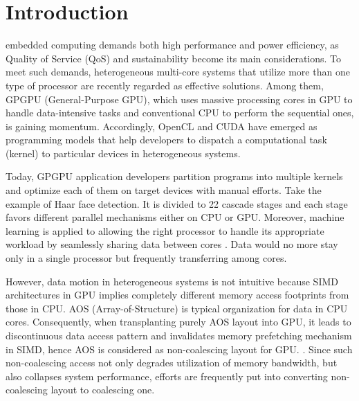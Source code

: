 \documentclass[10pt,journal,compsoc]{IEEEtran}
\begin{document}
%
\IEEEpeerreviewmaketitle


\section{Introduction}\label{sec:introduction}

 embedded computing demands both high performance and power efficiency,
as Quality of Service (QoS) and sustainability become its main considerations.
To meet such demands, heterogeneous multi-core systems that utilize more than one
type of processor are recently regarded as effective solutions.
Among them, GPGPU (General-Purpose GPU), which uses massive processing cores in GPU
to handle data-intensive tasks and conventional CPU to perform the sequential ones, is gaining momentum.
Accordingly, OpenCL and CUDA have emerged as programming models that help developers to
dispatch a computational task (kernel) to particular devices in heterogeneous systems.

Today, GPGPU application developers partition programs into multiple
kernels and optimize each of them on target devices with manual efforts.
Take the example of Haar face detection\cite{HAAR}.
It is divided to 22 cascade stages and each stage favors different parallel mechanisms either on CPU or GPU.
Moreover, machine learning is applied to allowing the right processor to handle its appropriate workload by
seamlessly sharing data between cores \cite{partition}. Data would no more stay only in a single processor
but frequently transferring among cores.


However, data motion in heterogeneous systems is not intuitive because
SIMD architectures in GPU implies completely different memory access footprints from those in CPU.
AOS (Array-of-Structure) is typical organization for data
in CPU cores. Consequently, when transplanting purely AOS layout into GPU,
it leads to discontinuous data access pattern and invalidates memory prefetching mechanism in SIMD, hence AOS is considered as non-coalescing layout for GPU.
\cite{CuMAPz}\cite{MemoryThreadLevelParallelism}.
Since such non-coalescing access not only degrades utilization of memory bandwidth, but also collapses system performance, efforts are frequently put into converting non-coalescing layout to coalescing one.
\end{document}
